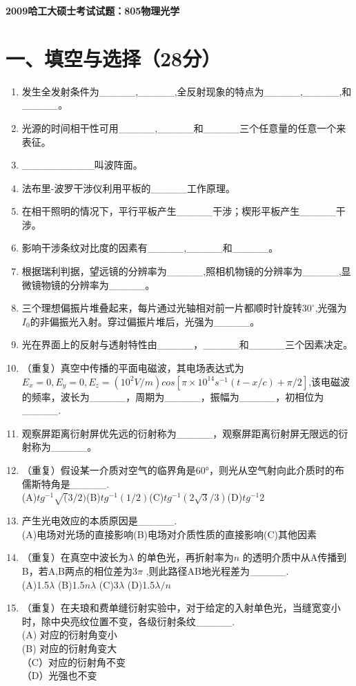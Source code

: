 \documentclass[12pt, a4paper]{article}
\theoremstyle{solution}
\begin{document}
\begin{center}
\Large\textbf{2009哈工大硕士考试试题：805物理光学}
\end{center}




\section*{一、填空与选择（28分）}
\begin{enumerate}
    \item 发生全发射条件为\_\_\_\_\_,\_\_\_\_\_,全反射现象的特点为\_\_\_\_\_,\_\_\_\_\_,和\_\_\_\_\_。
    \item 光源的时间相干性可用\_\_\_\_\_,\_\_\_\_\_和\_\_\_\_\_三个任意量的任意一个来表征。
    \item \_\_\_\_\_\_\_\_\_\_叫波阵面。
    \item 法布里-波罗干涉仪利用平板的\_\_\_\_\_工作原理。
    \item 在相干照明的情况下，平行平板产生\_\_\_\_\_干涉；楔形平板产生\_\_\_\_\_干涉。
    \item 影响干涉条纹对比度的因素有\_\_\_\_\_,\_\_\_\_\_和\_\_\_\_\_。
    \item 根据瑞利判据，望远镜的分辨率为\_\_\_\_\_,照相机物镜的分辨率为\_\_\_\_\_,显微镜物镜的分辨率为\_\_\_\_\_。
    \item 三个理想偏振片堆叠起来，每片通过光轴相对前一片都顺时针旋转$30^\circ$,光强为$I_0$的非偏振光入射。穿过偏振片堆后，光强为\_\_\_\_\_。
    \item 光在界面上的反射与透射特性由\_\_\_\_\_，\_\_\_\_\_和\_\_\_\_\_三个因素决定。
    \item （重复）真空中传播的平面电磁波，其电场表达式为$E_x=0,E_y=0,E_z=(10^2V/m)cos[\pi\times10^{14}s^{-1}(t-x/c)+\pi/2]$,该电磁波的频率，波长为\_\_\_\_\_，周期为\_\_\_\_\_，振幅为\_\_\_\_\_，初相位为\_\_\_\_\_.
    \item 观察屏距离衍射屏优先远的衍射称为\_\_\_\_\_，观察屏距离衍射屏无限远的衍射称为\_\_\_\_\_。
    \item （重复）假设某一介质对空气的临界角是60°，则光从空气射向此介质时的布儒斯特角是\_\_\_\_\_.\\(A)$tg^{-1}\sqrt({3}/2)$\qquad(B)$tg^{-1}(1/2)$\qquad(C)$tg^{-1}(2\sqrt{3}/3)$\qquad(D)$tg^{-1}2$
    \item 产生光电效应的本质原因是\_\_\_\_\_.\\(A)电场对光场的直接影响\qquad(B)电场对介质性质的直接影响\qquad(C)其他因素
    \item （重复）在真空中波长为$\lambda$ 的单色光，再折射率为$n$ 的透明介质中从A传播到B，若A,B两点的相位差为3\(\pi\) ,则此路径AB地光程差为\_\_\_\_\_.\\(A)1.5\(\lambda\) \qquad(B)1.5\(n\lambda\) \qquad(C)3\(\lambda\) \qquad(D)1.5\(\lambda/n\)
    \item （重复）在夫琅和费单缝衍射实验中，对于给定的入射单色光，当缝宽变小时，除中央亮纹位置不变，各级衍射条纹\_\_\_\_\_.\\(A) 对应的衍射角变小\\(B) 对应的衍射角变大\\（C）对应的衍射角不变\\（D）光强也不变
\end{enumerate}
\end{document}
